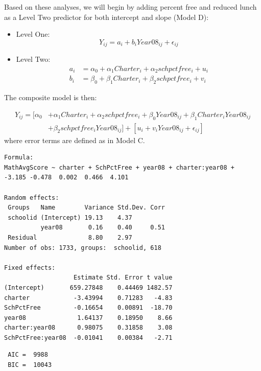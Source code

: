 \documentclass[
]{krantz}
\begin{document}
Based on these analyses, we will begin by adding percent free and reduced lunch as a Level Two predictor for both intercept and slope (Model D):

\begin{itemize}
\item
  Level One:
  \begin{equation}
  Y_{ij}=a_{i} + b_{i}Year08_{ij} + \epsilon_{ij}
  \end{equation}
\item
  Level Two:
  \begin{align*}
  a_{i} & = \alpha_{0} + \alpha_{1}Charter_i + \alpha_{2}schpctfree_i + u_{i}\\
  b_{i} & = \beta_{0} + \beta_{1}Charter_i + \beta_{2}schpctfree_i + v_{i}
  \end{align*}
\end{itemize}

The composite model is then:

\begin{align}
Y_{ij}= [\alpha_{0}&+\alpha_{1}Charter_i +\alpha_{2}schpctfree_i + \beta_{0}Year08_{ij} + \beta_{1}Charter_iYear08_{ij}  \\ &+ \beta_{2}schpctfree_iYear08_{ij}] + 
[u_{i} + v_{i}Year08_{ij} + \epsilon_{ij}]
\end{align}
where error terms are defined as in Model C.

\begin{verbatim}
Formula: 
MathAvgScore ~ charter + SchPctFree + year08 + charter:year08 +  
-3.185 -0.478  0.002  0.466  4.101 

Random effects:
 Groups   Name        Variance Std.Dev. Corr
 schoolid (Intercept) 19.13    4.37         
          year08       0.16    0.40     0.51
 Residual              8.80    2.97         
Number of obs: 1733, groups:  schoolid, 618

Fixed effects:
                   Estimate Std. Error t value
(Intercept)       659.27848    0.44469 1482.57
charter            -3.43994    0.71283   -4.83
SchPctFree         -0.16654    0.00891  -18.70
year08              1.64137    0.18950    8.66
charter:year08      0.98075    0.31858    3.08
SchPctFree:year08  -0.01041    0.00384   -2.71
\end{verbatim}

\begin{verbatim}
 AIC =  9988 
 BIC =  10043 
\end{verbatim}
\end{document}
